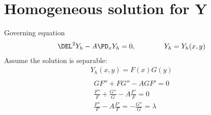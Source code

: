 \documentclass[11pt]{article}
\begin{document}
\section{Homogeneous solution for Y}
Governing equation
\begin{equation}\begin{aligned}
\DEL^2 Y_h - A \PD_x Y_h = 0, \qquad\qquad Y_h = Y_h(x,y) \\
\end{aligned} \end{equation}
Assume the solution is separable:
\begin{equation}\begin{aligned}
Y_h(x,y) = F(x)G(y) \\
\end{aligned} \end{equation}
\begin{equation}\begin{aligned}
G F'' + FG'' - A G F' = 0 \\
 \frac{F''}{F} + \frac{G''}{G} - A \frac{F'}{F} = 0 \\
 \frac{F''}{F} - A \frac{F'}{F} = - \frac{G''}{G} = \lambda \\
\end{aligned} \end{equation}
\end{document}
